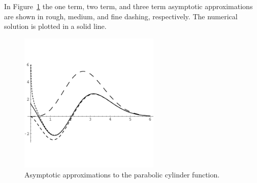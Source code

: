 In Figure~\ref{par_cyl} the one term, two term, and three term asymptotic
approximations are shown in rough, medium, and fine dashing, respectively.
The numerical solution is plotted in a solid line.

\begin{figure}[h!]
  \begin{center}
    \includegraphics[width=0.6\textwidth]{ode/asymptotic/par_cyl}
  \end{center}
  \caption{Asymptotic approximations to the parabolic cylinder function.}
  \label{par_cyl}
\end{figure}










